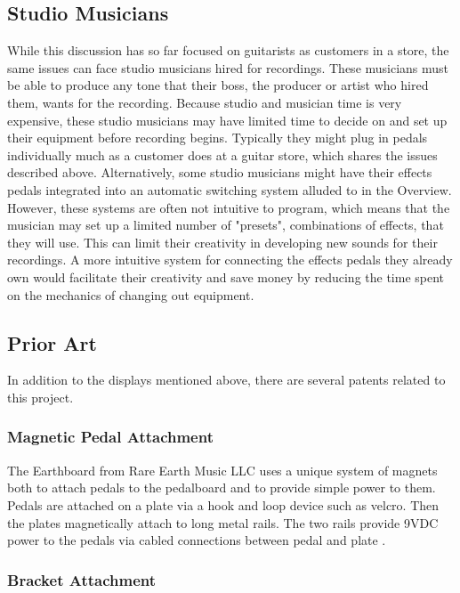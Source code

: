 \documentclass{article}
\begin{document}
	\subsection{Studio Musicians}

	While this discussion has so far focused on guitarists as customers in a store, the same issues can face studio musicians hired for recordings.  These musicians must be able to produce any tone that their boss, the producer or artist who hired them, wants for the recording.  Because studio and musician time is very expensive, these studio musicians may have limited time to decide on and set up their equipment before recording begins.  Typically they might plug in pedals individually much as a customer does at a guitar store, which shares the issues described above.  Alternatively, some studio musicians might have their effects pedals integrated into an automatic switching system alluded to in the Overview.  However, these systems are often not intuitive to program, which means that the musician may set up a limited number of "presets", combinations of effects, that they will use.  This can limit their creativity in developing new sounds for their recordings.  A more intuitive system for connecting the effects pedals they already own would facilitate their creativity and save money by reducing the time spent on the mechanics of changing out equipment.

	\subsection{Prior Art}
	In addition to the displays mentioned above, there are several patents related to this project.

		\subsubsection{Magnetic Pedal Attachment}
		The Earthboard from Rare Earth Music LLC uses a unique system of magnets both to attach pedals to the pedalboard and to provide simple power to them.  Pedals are attached on a plate via a hook and loop device such as velcro.  Then the plates magnetically attach to long metal rails.  The two rails provide 9VDC power to the pedals via cabled connections between pedal and plate \cite{EARTHBOARDSITE}.

		\subsubsection{Bracket Attachment}
\end{document}
